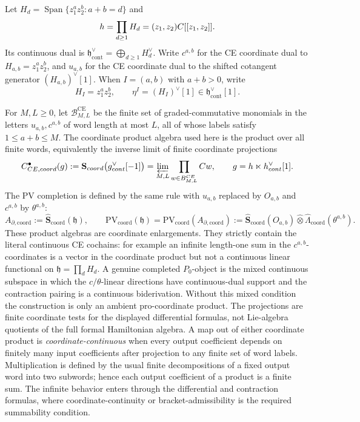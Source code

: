 \begin{defn}\label{defn:formal-disk-ce-pv-completion}
  Let \(H_d=\operatorname{Span}\{z_1^az_2^b:a+b=d\}\) and
  \[
    h=\prod_{d\geq1}H_d=(z_1,z_2)C[[z_1,z_2]] .
  \]
  Its continuous dual is
  \(\mathfrak h^\vee_{\mathrm{cont}}=\bigoplus_{d\geq1}H_d^\vee\).
  Write \(c^{a,b}\) for the CE coordinate dual to
  \(H_{a,b}=z_1^az_2^b\), and \(u_{a,b}\) for the CE coordinate dual to
  the shifted cotangent generator \((H_{a,b})^\vee[1]\).  When
  \(I=(a,b)\) with \(a+b>0\), write
  \[
    H_I=z_1^az_2^b,\qquad
    \eta^I=(H_I)^\vee[1]\in\mathfrak h^\vee_{\mathrm{cont}}[1].
  \]

  For \(M,L\geq0\), let \(\mathcal B_{M,L}^{\mathrm{CE}}\) be the
  finite set of graded-commutative monomials in the letters
  \(u_{a,b},c^{a,b}\) of word length at most \(L\), all of whose labels
  satisfy \(1\leq a+b\leq M\).  The coordinate product algebra used here
  is the product over all finite words, equivalently the inverse limit of
  finite coordinate projections
  \[
    C^\bullet_{CE,coord}(g)
    :=
    \mathbf S_{coord}
    \bigl(g^\vee_{cont}[-1]\bigr)
    =
    \varprojlim_{M,L}\prod_{w\in B_{M,L}^{CE}}C w ,
    \qquad
    g=h\ltimes
      h^\vee_{cont}[1].
  \]
	  The PV completion is defined by the same rule with \(u_{a,b}\)
	  replaced by \(O_{a,b}\) and \(c^{a,b}\) by \(\theta^{a,b}\):
	  \[
	    A_{\partial,\mathrm{coord}}
	    :=\widehat{\mathbf S}_{\mathrm{coord}}(\mathfrak h),
	    \qquad
	    \mathrm{PV}_{\mathrm{coord}}(\mathfrak h)
	    =
	    \mathrm{PV}_{\mathrm{coord}}(A_{\partial,\mathrm{coord}})
	    :=
	    \widehat{\mathbf S}_{\mathrm{coord}}(O_{a,b})
	    \widehat\otimes
    \widehat\Lambda_{\mathrm{coord}}(\theta^{a,b}).
  \]
	  These product algebras are coordinate enlargements.  They strictly
  contain the literal continuous CE cochains: for example an infinite
  length-one sum in the \(c^{a,b}\)-coordinates is a vector in the
  coordinate product but not a continuous linear functional on
  \(\mathfrak h=\prod_d H_d\).  A genuine completed \(P_0\)-object is the
  mixed continuous subspace in which the \(c/\theta\)-linear directions
  have continuous-dual support and the contraction pairing is a
  continuous biderivation.  Without this mixed condition the construction
	  is only an ambient pro-coordinate product.  The projections are finite
	  coordinate tests for the displayed differential formulas, not
	  Lie-algebra quotients of the full formal Hamiltonian algebra.
  A map out of either coordinate product is \emph{coordinate-continuous}
  when every output coefficient depends on finitely many input
  coefficients after projection to any finite set of word labels.
  Multiplication is defined by the usual finite decompositions of a fixed
  output word into two subwords; hence each output coefficient of a
  product is a finite sum.  The infinite behavior enters through the
  differential and contraction formulas, where coordinate-continuity or
  bracket-admissibility is the required summability condition.
		\end{defn}

